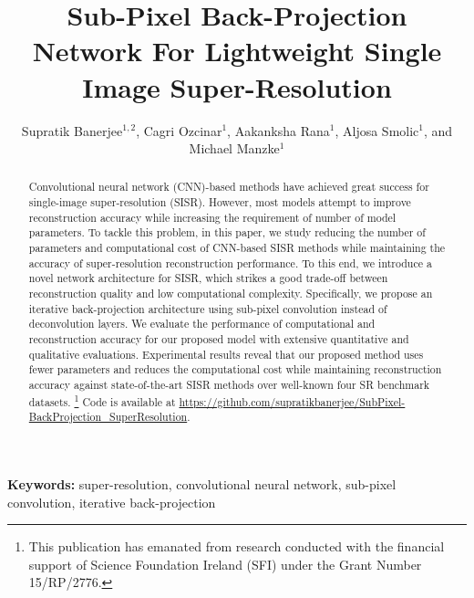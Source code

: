 \documentclass[a4paper,11pt]{article}
\begin{document}
\title{Sub-Pixel Back-Projection Network For Lightweight Single Image Super-Resolution}



\author{Supratik Banerjee$^{1,2}$, Cagri Ozcinar$^{1}$, Aakanksha Rana$^{1}$, Aljosa Smolic$^{1}$, and  Michael Manzke$^{1}$}


\thispagestyle{empty}
\date{}










\maketitle
\begin{abstract}
Convolutional neural network (CNN)-based methods have achieved great success for single-image super-resolution (SISR). However, most models attempt to improve reconstruction accuracy while increasing the requirement of number of model parameters. To tackle this problem, in this paper, we study reducing the number of parameters and computational cost of CNN-based SISR methods while maintaining the accuracy of super-resolution reconstruction performance. To this end, we introduce a novel network architecture for SISR, which strikes a good trade-off between reconstruction quality and low computational complexity. Specifically, we propose an iterative back-projection architecture using sub-pixel convolution instead of deconvolution layers. We evaluate the performance of computational and reconstruction accuracy for our proposed model with extensive quantitative and qualitative evaluations. Experimental results reveal that our proposed method uses fewer parameters and reduces the computational cost while maintaining reconstruction accuracy against state-of-the-art SISR methods over well-known four SR benchmark datasets.
\footnote{This publication has emanated from research conducted with the financial support of Science Foundation Ireland (SFI) under the Grant Number 15/RP/2776.} Code is available at \url{https://github.com/supratikbanerjee/SubPixel-BackProjection_SuperResolution}.




\end{abstract}
\textbf{Keywords:} super-resolution, convolutional neural network, sub-pixel convolution, iterative back-projection
\end{document}
